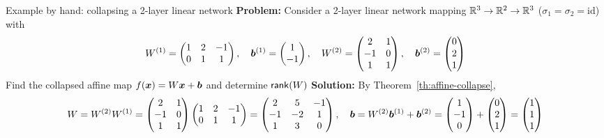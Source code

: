 \documentclass[aspectratio=169]{beamer}\usepackage[]{graphicx}\usepackage[]{xcolor}
\begin{document}
\begin{frame}{Example by hand: collapsing a 2-layer linear network}
\textbf{Problem:} Consider a 2-layer linear network mapping $\mathbb{R}^3 \to \mathbb{R}^2 \to \mathbb{R}^3$ ($\sigma_1 = \sigma_2 = \text{id}$) with
\[
W^{(1)} = \begin{pmatrix} 1 & 2 & -1 \\ 0 & 1 & 1 \end{pmatrix}, \quad
\bm{b}^{(1)} = \begin{pmatrix} 1 \\ -1 \end{pmatrix}, \quad
W^{(2)} = \begin{pmatrix} 2 & 1 \\ -1 & 0 \\ 1 & 1 \end{pmatrix}, \quad
\bm{b}^{(2)} = \begin{pmatrix} 0 \\ 2 \\ 1 \end{pmatrix}
\]
Find the collapsed affine map $f(\bm{x}) = W\bm{x} + \bm{b}$ and determine $\mathsf{rank}(W)$
\vfill
\textbf{Solution:} By Theorem~\ref{th:affine-collapse},
\[
W = W^{(2)} W^{(1)} =
\begin{pmatrix} 2 & 1 \\ -1 & 0 \\ 1 & 1 \end{pmatrix}
\begin{pmatrix} 1 & 2 & -1 \\ 0 & 1 & 1 \end{pmatrix}
=
\begin{pmatrix} 2 & 5 & -1 \\ -1 & -2 & 1 \\ 1 & 3 & 0 \end{pmatrix}, \quad
\bm{b} = W^{(2)} \bm{b}^{(1)} + \bm{b}^{(2)} =
\begin{pmatrix} 1 \\ -1 \\ 0 \end{pmatrix}
+
\begin{pmatrix} 0 \\ 2 \\ 1 \end{pmatrix}
=
\begin{pmatrix} 1 \\ 1 \\ 1 \end{pmatrix}
\]
\end{frame}
\end{document}
